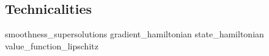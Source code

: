 \begin{appendices}
	\chapter{Technicalities}
	{smoothness_supersolutions}
	{gradient_hamiltonian}
	{state_hamiltonian}
	{value_function_lipschitz}
\end{appendices}